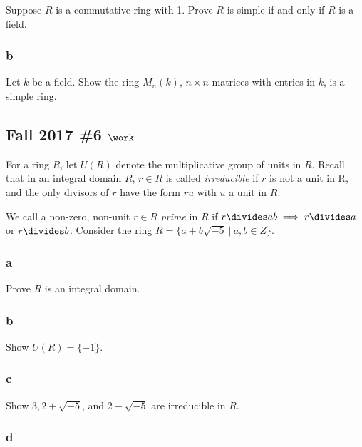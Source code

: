 Suppose \(R\) is a commutative ring with 1. Prove \(R\) is simple if and
only if \(R\) is a field.

\hypertarget{b-30}{%
\subsubsection{b}\label{b-30}}

Let \(k\) be a field. Show the ring \(M_n (k)\), \(n \times n\) matrices
with entries in \(k\), is a simple ring.

\hypertarget{fall-2017-6-work}{%
\subsection{\texorpdfstring{Fall 2017 \#6
\(\work\)}{Fall 2017 \#6 \textbackslash work}}\label{fall-2017-6-work}}

For a ring \(R\), let \(U(R)\) denote the multiplicative group of units
in \(R\). Recall that in an integral domain \(R\), \(r \in R\) is called
\emph{irreducible} if \(r\) is not a unit in R, and the only divisors of
\(r\) have the form \(ru\) with \(u\) a unit in \(R\).

We call a non-zero, non-unit \(r \in R\) \emph{prime} in \(R\) if
\(r \divides ab \implies r \divides a\) or \(r \divides b\). Consider
the ring \(R = \{a + b \sqrt{-5}{~\mathrel{\Big|}~}a, b \in Z\}\).

\hypertarget{a-41}{%
\subsubsection{a}\label{a-41}}

Prove \(R\) is an integral domain.

\hypertarget{b-31}{%
\subsubsection{b}\label{b-31}}

Show \(U(R) = \{\pm1\}\).

\hypertarget{c-23}{%
\subsubsection{c}\label{c-23}}

Show \(3, 2 + \sqrt{-5}\), and \(2 - \sqrt{-5}\) are irreducible in
\(R\).

\hypertarget{d-9}{%
\subsubsection{d}\label{d-9}}

